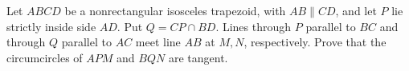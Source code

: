 Let $ABCD$ be a nonrectangular isosceles trapezoid, with $AB\parallel CD$, and let $P$ lie strictly inside side $AD$. Put $Q=CP\cap BD$. Lines through $P$ parallel to $BC$ and through $Q$ parallel to $AC$ meet line $AB$ at $M,N$, respectively. Prove that the circumcircles of $APM$ and $BQN$ are tangent.
